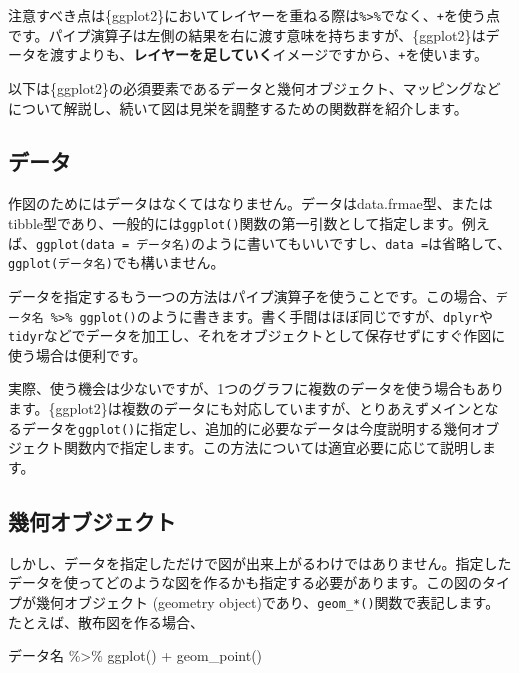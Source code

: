 \documentclass[
  a4paper,
  pandoc,
  ja=standard,
  jafont=haranoaji]{bxjsbook}
\newenvironment{Shaded}{\begin{snugshade}}{\end{snugshade}}
\newcommand{\FunctionTok}[1]{\textcolor[rgb]{0.28,0.35,0.67}{#1}}
\newcommand{\NormalTok}[1]{\textcolor[rgb]{0.00,0.48,0.65}{#1}}
\newcommand{\SpecialCharTok}[1]{\textcolor[rgb]{0.37,0.37,0.37}{#1}}
\begin{document}
注意すべき点は\{ggplot2\}においてレイヤーを重ねる際は\texttt{\%\textgreater{}\%}でなく、\texttt{+}を使う点です。パイプ演算子は左側の結果を右に渡す意味を持ちますが、\{ggplot2\}はデータを渡すよりも、\textbf{レイヤーを足していく}イメージですから、\texttt{+}を使います。

以下は\{ggplot2\}の必須要素であるデータと幾何オブジェクト、マッピングなどについて解説し、続いて図は見栄を調整するための関数群を紹介します。

\hypertarget{ux30c7ux30fcux30bf}{%
\subsection{データ}\label{ux30c7ux30fcux30bf}}

作図のためにはデータはなくてはなりません。データはdata.frmae型、またはtibble型であり、一般的には\texttt{ggplot()}関数の第一引数として指定します。例えば、\texttt{ggplot(data\ =\ データ名)}のように書いてもいいですし、\texttt{data\ =}は省略して、\texttt{ggplot(データ名)}でも構いません。

データを指定するもう一つの方法はパイプ演算子を使うことです。この場合、\texttt{データ名\ \%\textgreater{}\%\ ggplot()}のように書きます。書く手間はほぼ同じですが、\texttt{dplyr}や\texttt{tidyr}などでデータを加工し、それをオブジェクトとして保存せずにすぐ作図に使う場合は便利です。

実際、使う機会は少ないですが、1つのグラフに複数のデータを使う場合もあります。\{ggplot2\}は複数のデータにも対応していますが、とりあえずメインとなるデータを\texttt{ggplot()}に指定し、追加的に必要なデータは今度説明する幾何オブジェクト関数内で指定します。この方法については適宜必要に応じて説明します。

\hypertarget{ux5e7eux4f55ux30aaux30d6ux30b8ux30a7ux30afux30c8}{%
\subsection{幾何オブジェクト}\label{ux5e7eux4f55ux30aaux30d6ux30b8ux30a7ux30afux30c8}}

しかし、データを指定しただけで図が出来上がるわけではありません。指定したデータを使ってどのような図を作るかも指定する必要があります。この図のタイプが幾何オブジェクト
(geometry
object)であり、\texttt{geom\_*()}関数で表記します。たとえば、散布図を作る場合、

\begin{Shaded}
\begin{Highlighting}[numbers=left,,]
\NormalTok{データ名 }\SpecialCharTok{\%\textgreater{}\%}
  \FunctionTok{ggplot}\NormalTok{() }\SpecialCharTok{+}
  \FunctionTok{geom\_point}\NormalTok{()}
\end{Highlighting}
\end{Shaded}
\end{document}
